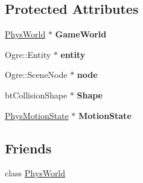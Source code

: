 \subsection*{Protected Attributes}
\begin{DoxyCompactItemize}
\item 
\hypertarget{classActorBase_a02a4306818777f7c2e5853e8babd485e}{
\hyperlink{classPhysWorld}{PhysWorld} $\ast$ {\bfseries GameWorld}}
\label{dd/d7b/classActorBase_a02a4306818777f7c2e5853e8babd485e}

\item 
\hypertarget{classActorBase_ada6ceb752605b29357b6c5d53c477696}{
Ogre::Entity $\ast$ {\bfseries entity}}
\label{dd/d7b/classActorBase_ada6ceb752605b29357b6c5d53c477696}

\item 
\hypertarget{classActorBase_affa8851ae622e1d420afa4770ab89ea4}{
Ogre::SceneNode $\ast$ {\bfseries node}}
\label{dd/d7b/classActorBase_affa8851ae622e1d420afa4770ab89ea4}

\item 
\hypertarget{classActorBase_aff0d385bc9d30cf053838fd61b32ebad}{
btCollisionShape $\ast$ {\bfseries Shape}}
\label{dd/d7b/classActorBase_aff0d385bc9d30cf053838fd61b32ebad}

\item 
\hypertarget{classActorBase_a4ae7c4fd3b9449771e1c1bbd09cf103e}{
\hyperlink{classPhysMotionState}{PhysMotionState} $\ast$ {\bfseries MotionState}}
\label{dd/d7b/classActorBase_a4ae7c4fd3b9449771e1c1bbd09cf103e}

\end{DoxyCompactItemize}
\subsection*{Friends}
\begin{DoxyCompactItemize}
\item 
\hypertarget{classActorBase_a375fd37c70c941f0442997a60fdb05c7}{
class \hyperlink{classActorBase_a375fd37c70c941f0442997a60fdb05c7}{PhysWorld}}
\label{dd/d7b/classActorBase_a375fd37c70c941f0442997a60fdb05c7}

\end{DoxyCompactItemize}


